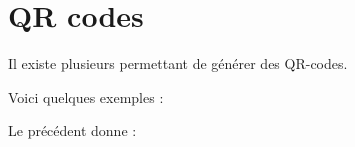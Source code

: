 \chapter{QR codes}

Il existe plusieurs  permettant de générer des QR-codes.

Voici quelques exemples :


Le  précédent donne :

